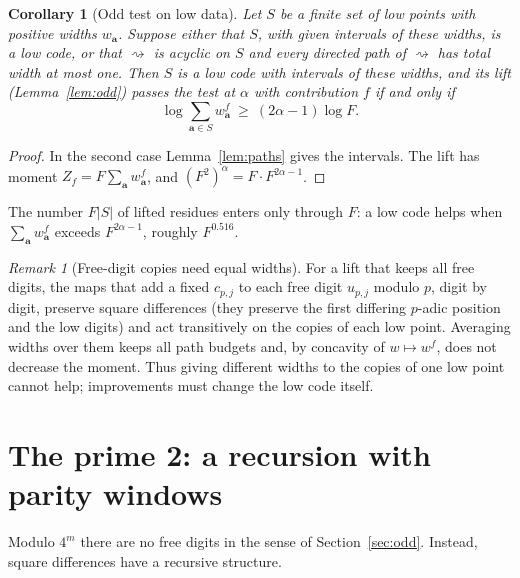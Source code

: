 \documentclass[11pt]{article}
\newtheorem{corollary}[theorem]{Corollary}
\theoremstyle{definition}
\theoremstyle{remark}
\newtheorem{remark}[theorem]{Remark}
\newcommand{\card}[1]{\lvert #1\rvert}
\newcommand{\sto}{\rightsquigarrow}
\begin{document}
\begin{corollary}[Odd test on low data]\label{cor:oddtest}
Let $S$ be a finite set of low points with positive widths $w_{\mathbf a}$.
Suppose either that $S$, with given intervals of these widths, is a low code,
or that $\sto$ is acyclic on $S$ and every directed path of $\sto$ has total
width at most one. Then $S$ is a low code with intervals of these widths, and
its lift (Lemma~\ref{lem:odd}) passes the test at $\alpha$ with contribution
$f$ if and only if
\[
 \log\sum_{\mathbf a\in S}w_{\mathbf a}^f\ \ge\ (2\alpha-1)\log F .
\]
\end{corollary}
\begin{proof}
In the second case Lemma~\ref{lem:paths} gives the intervals. The lift has
moment $Z_f=F\sum_{\mathbf a}w_{\mathbf a}^f$, and
$(F^2)^\alpha=F\cdot F^{2\alpha-1}$.
\end{proof}
The number $F\card S$ of lifted residues enters only through $F$: a low code
helps when $\sum_{\mathbf a}w_{\mathbf a}^f$ exceeds $F^{2\alpha-1}$, roughly
$F^{0.516}$.

\begin{remark}[Free-digit copies need equal widths]\label{rem:fiber}
For a lift that keeps all free digits, the maps that add a fixed
$c_{p,j}$ to each free digit $u_{p,j}$ modulo $p$, digit by digit, preserve
square differences (they preserve the first differing $p$-adic position and
the low digits) and act transitively on the copies of each low point. Averaging widths over them keeps all path budgets and, by concavity of
$w\mapsto w^f$, does not decrease the moment. Thus giving different widths to
the copies of one low point cannot help; improvements must change the low
code itself.
\end{remark}

\section{The prime 2: a recursion with parity windows}\label{sec:binary}
Modulo $4^m$ there are no free digits in the sense of
Section~\ref{sec:odd}. Instead, square differences have a recursive structure.
\end{document}
